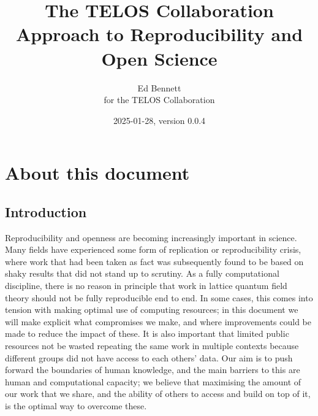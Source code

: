 \documentclass{article}
\title{The TELOS Collaboration Approach to Reproducibility and Open Science}
\author{Ed Bennett\\for the TELOS Collaboration}
\date{2025-01-28, version 0.0.4}
\begin{document}
\maketitle


\makeatletter
\renewcommand\tableofcontents{%
    \subsection{\contentsname
        \@mkboth{%
           \MakeUppercase\contentsname}{\MakeUppercase\contentsname}}%
    \@starttoc{toc}%
  }
\makeatother

\section{About this document}

\subsection{Introduction}

Reproducibility and openness are becoming increasingly important in science.
Many fields have experienced some form of replication or reproducibility crisis,
where work that had been taken as fact was subsequently found
to be based on shaky results that did not stand up to scrutiny.
As a fully computational discipline,
there is no reason in principle
that work in lattice quantum field theory should not be fully reproducible end to end.
In some cases,
this comes into tension with making optimal use of computing resources;
in this document we will make explicit what compromises we make,
and where improvements could be made to reduce the impact of these.
It is also important that limited public resources not be wasted
repeating the same work in multiple contexts
because different groups did not have access to each others' data.
Our aim is to push forward the boundaries of human knowledge,
and the main barriers to this are human and computational capacity;
we believe that maximising the amount of our work that we share,
and the ability of others to access and build on top of it,
is the optimal way to overcome these.
\end{document}
